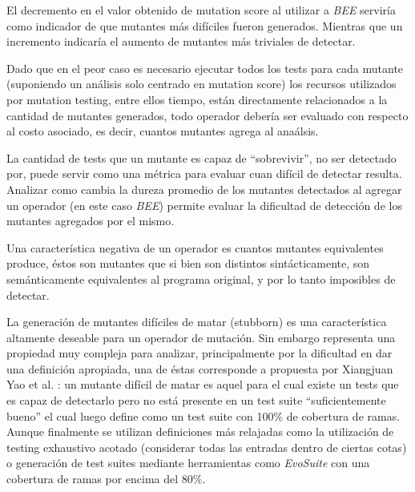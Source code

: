 \begin{description}[leftmargin=8em,style=nextline]
	\item[Mutation score] El decremento en el valor obtenido de mutation score al utilizar a \emph{BEE} servir\'ia como indicador de que mutantes m\'as dif\'iciles fueron generados. Mientras que un incremento indicar\'ia el aumento de mutantes m\'as triviales de detectar.
	\item[Cantidad de mutantes] Dado que en el peor caso es necesario ejecutar todos los tests para cada mutante (suponiendo un an\'alisis solo centrado en mutation score) los recursos utilizados por mutation testing, entre ellos tiempo, est\'an directamente relacionados a la cantidad de mutantes generados, todo operador deber\'ia ser evaluado con respecto al costo asociado, es decir, cuantos mutantes agrega al ana\'alsis.
	\item[Dureza (toughness)] La cantidad de tests que un mutante es capaz de ``sobrevivir'', no ser detectado por, puede servir como una m\'etrica para evaluar cuan dif\'icil de detectar resulta. Analizar como cambia la dureza promedio de los mutantes detectados al agregar un operador (en este caso \emph{BEE}) permite evaluar la dificultad de detecci\'on de los mutantes agregados por el mismo.
	\item[Mutantes equivalentes] Una caracter\'istica negativa de un operador es cuantos mutantes equivalentes produce, \'estos son mutantes que si bien son distintos sint\'acticamente, son sem\'anticamente equivalentes al programa original, y por lo tanto imposibles de detectar.
	\item[Mutantes dif\'iciles de matar (stubborn)] La generaci\'on de mutantes dif\'iciles de matar (stubborn) es una caracter\'istica altamente deseable para un operador de mutaci\'on. Sin embargo representa una propiedad muy compleja para analizar, principalmente por la dificultad en dar una definici\'on apropiada, una de \'estas corresponde a propuesta por Xiangjuan Yao et al. \cite{bibliography.mutation.evaluation.stubborn}: un mutante dif\'icil de matar es aquel para el cual existe un tests que es capaz de detectarlo pero no est\'a presente en un test suite ``suficientemente bueno'' el cual luego define como un test suite con 100\% de cobertura de ramas. Aunque finalmente se utilizan definiciones m\'as relajadas como la utilizaci\'on de testing exhaustivo acotado (considerar todas las entradas dentro de ciertas cotas) o generaci\'on de test suites mediante herramientas como \emph{EvoSuite} con una cobertura de ramas por encima del 80\%.
\end{description}

